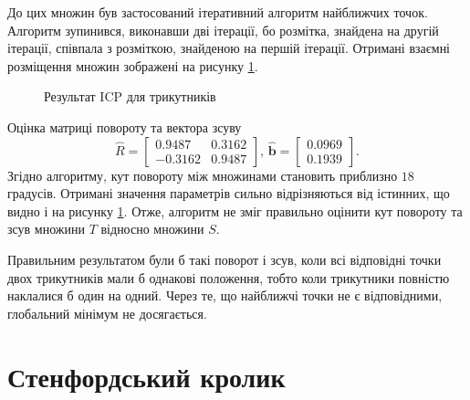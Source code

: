 До цих множин був застосований ітеративний алгоритм найближчих точок.
Алгоритм зупинився, виконавши дві ітерації, бо розмітка, знайдена на другій ітерації,
співпала з розміткою, знайденою на першій ітерації.
Отримані взаємні розміщення множин зображені на рисунку
\ref{fig:triangles_result}.

\begin{figure}[h]
  \centering
  
  \caption{Результат ICP для трикутників}
  \label{fig:triangles_result}
\end{figure}

Оцінка матриці повороту та вектора зсуву
\begin{equation*}
  \hat{R} =
  \begin{bmatrix}
    0.9487  & 0.3162 \\
    -0.3162 & 0.9487
  \end{bmatrix}, \,
  \hat{\boldsymbol{b}} =
  \begin{bmatrix}
    0.0969 \\
    0.1939
  \end{bmatrix}.
\end{equation*}
Згідно алгоритму, кут повороту між множинами становить приблизно $18$ градусів.
Отримані значення параметрів сильно відрізняються від істинних,
що видно і на рисунку \ref{fig:triangles_result}.
Отже, алгоритм не зміг правильно оцінити кут повороту та зсув множини $T$
відносно множини $S$.

Правильним результатом були б такі поворот і зсув,
коли всі відповідні точки двох трикутників мали б однакові положення,
тобто коли трикутники повністю наклалися б один на одний.
Через те, що найближчі точки не є відповідними,
глобальний мінімум не досягається.

\section{Стенфордський кролик}

